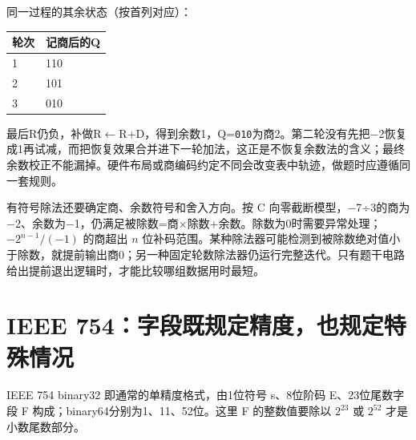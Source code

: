 同一过程的其余状态（按首列对应）：

\par\medskip\noindent\begin{minipage}{\linewidth}\fontsize{9.3}{12}\selectfont\begin{tabularx}{\linewidth}{@{}YY@{}}
\toprule\noalign{}
轮次 & 记商后的Q \\
\midrule\noalign{}


1 & 110 \\
2 & 101 \\
3 & 010 \\
\bottomrule\end{tabularx}
\end{minipage}\par\medskip

最后R仍负，补做R\ensuremath{\leftarrow}R+D，得到余数1，Q=\texttt{010}为商2。第二轮没有先把\ensuremath{-}2恢复成1再试减，而把恢复效果合并进下一轮加法，这正是不恢复余数法的含义；最终余数校正不能漏掉。硬件布局或商编码约定不同会改变表中轨迹，做题时应遵循同一套规则。

有符号除法还要确定商、余数符号和舍入方向。按 C 向零截断模型，\ensuremath{-}7÷3的商为\ensuremath{-}2、余数为\ensuremath{-}1，仍满足被除数=商\ensuremath{\times}除数+余数。除数为0时需要异常处理；\(-2^{n-1}/(-1)\) 的商超出 \(n\) 位补码范围。某种除法器可能检测到被除数绝对值小于除数，就提前输出商0；另一种固定轮数除法器仍运行完整迭代。只有题干电路给出提前退出逻辑时，才能比较哪组数据用时最短。

\section{IEEE 754：字段既规定精度，也规定特殊情况}\label{CO02-18}

IEEE 754 binary32 即通常的单精度格式，由1位符号 s、8位阶码 E、23位尾数字段 F 构成；binary64分别为1、11、52位。这里 F 的整数值要除以 \(2^{23}\) 或 \(2^{52}\) 才是小数尾数部分。

